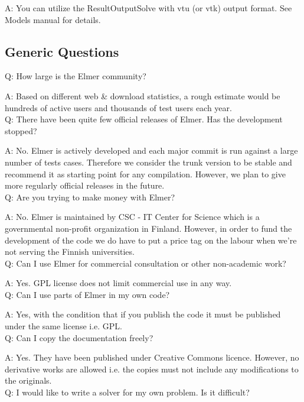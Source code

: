     A: You can utilize the ResultOutputSolve with vtu (or vtk) output format. See Models manual for details.\\

\subsection{Generic Questions}

    Q: How large is the Elmer community?

    A: Based on different web \& download statistics, a rough estimate would be hundreds of active users and thousands of test users each year.\\

    Q: There have been quite few official releases of Elmer. Has the development stopped?

    A: No. Elmer is actively developed and each major commit is run against a large number of tests cases. Therefore we consider the trunk version to be stable and recommend it as starting point for any compilation. However, we plan to give more regularly official releases in the future.\\

    Q: Are you trying to make money with Elmer?

    A: No. Elmer is maintained by CSC - IT Center for Science which is a governmental non-profit organization in Finland. However, in order to fund the development of the code we do have to put a price tag on the labour when we're not serving the Finnish universities.\\

    Q: Can I use Elmer for commercial consultation or other non-academic work?

    A: Yes. GPL license does not limit commercial use in any way.\\

    Q: Can I use parts of Elmer in my own code?

    A: Yes, with the condition that if you publish the code it must be published under the same license i.e. GPL.\\

    Q: Can I copy the documentation freely?

    A: Yes. They have been published under Creative Commons licence. However, no derivative works are allowed i.e. the copies must not include any modifications to the originals.\\

    Q: I would like to write a solver for my own problem. Is it difficult?

